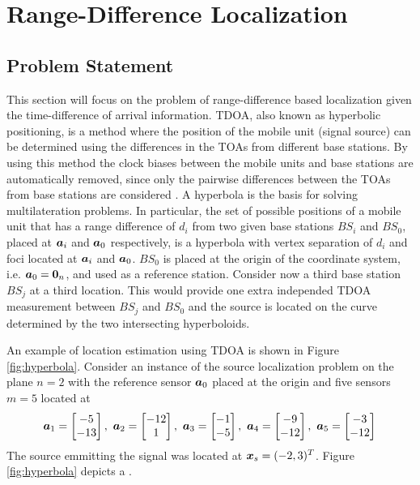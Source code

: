 
\section{Range-Difference Localization}

\subsection{Problem Statement}


This section will focus on the problem of range-difference based localization given the time-difference of arrival information. TDOA, also known as hyperbolic positioning, is a method where the position of the mobile unit (signal source) can be determined using the differences in the TOAs from different base stations. By using this method the clock biases between the mobile units and base stations are automatically removed, since only the pairwise differences between the TOAs from base stations are  considered \cite{LocAlg}. A hyperbola is the basis for solving multilateration problems. In particular, the set of possible positions of a mobile unit that has a range difference of $d_i$ from two given base stations $BS_i$ and $BS_0$, placed at $\mbox{\boldmath$a$}_i$ and $\mbox{\boldmath$a$}_0$ respectively, is a hyperbola with vertex separation of $d_i$ and foci located at $\mbox{\boldmath$a$}_i$ and $\mbox{\boldmath$a$}_0$. $BS_0$ is placed at the origin of the coordinate system, i.e. $\mbox{\boldmath$a$}_0 = \mbox{\boldmath${0}$}_n$, and used as a reference station. Consider now a third base station $BS_j$ at a third location. This would provide one extra independed TDOA measurement between $BS_j$ and $BS_0$ and the source is located on the curve determined by the two intersecting hyperboloids.
 
An example of location estimation using TDOA is shown in Figure \ref{fig:hyperbola}. Consider an instance of the source localization problem on the plane $n = 2$ with the reference sensor $\mbox{\boldmath$a$}_0$ placed at the origin and five sensors $m = 5$ located at 
\begin{equation}
\nonumber
\mbox{\boldmath$a$}_1 = \begin{bmatrix}
-5 \\ -13
\end{bmatrix}, \
\mbox{\boldmath$a$}_2 = \begin{bmatrix}
-12 \\ 1
\end{bmatrix},  \
\mbox{\boldmath$a$}_3 = \begin{bmatrix}
-1 \\ -5
\end{bmatrix}, \
\mbox{\boldmath$a$}_4 = \begin{bmatrix}
-9 \\ -12
\end{bmatrix}, \
\mbox{\boldmath$a$}_5 = \begin{bmatrix}
-3 \\ -12
\end{bmatrix}
\\
\end{equation}
The source emmitting the signal was located at $\mbox{\boldmath$x$}_s = (-2,3)^T$. Figure \ref{fig:hyperbola} depicts a .

